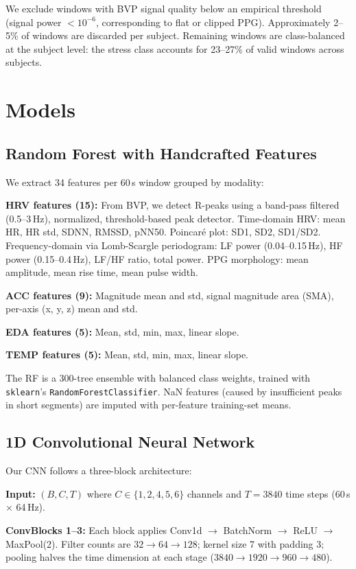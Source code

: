 \documentclass[10pt,twocolumn]{article}
\begin{document}
We exclude windows with BVP signal quality below an empirical threshold
(signal power $< 10^{-6}$, corresponding to flat or clipped PPG).
Approximately 2--5\% of windows are discarded per subject.
Remaining windows are class-balanced at the subject level: the stress
class accounts for 23--27\% of valid windows across subjects.

\section{Models}
\label{sec:models}

\subsection{Random Forest with Handcrafted Features}

We extract 34 features per 60\,s window grouped by modality:

\textbf{HRV features (15):} From BVP, we detect R-peaks using a
band-pass filtered (0.5--3\,Hz), normalized, threshold-based peak detector.
Time-domain HRV: mean HR, HR std, SDNN, RMSSD, pNN50.
Poincar\'e plot: SD1, SD2, SD1/SD2. Frequency-domain via Lomb-Scargle
periodogram: LF power (0.04--0.15\,Hz), HF power (0.15--0.4\,Hz),
LF/HF ratio, total power. PPG morphology: mean amplitude, mean rise time,
mean pulse width.

\textbf{ACC features (9):} Magnitude mean and std, signal magnitude area (SMA),
per-axis (x, y, z) mean and std.

\textbf{EDA features (5):} Mean, std, min, max, linear slope.

\textbf{TEMP features (5):} Mean, std, min, max, linear slope.

The RF is a 300-tree ensemble with balanced class weights, trained with
\texttt{sklearn}'s \texttt{RandomForestClassifier}. NaN features
(caused by insufficient peaks in short segments) are imputed with
per-feature training-set means.

\subsection{1D Convolutional Neural Network}

Our CNN follows a three-block architecture:

\textbf{Input:} $(B, C, T)$ where $C \in \{1,2,4,5,6\}$ channels and
$T=3840$ time steps (60\,s $\times$ 64\,Hz).

\textbf{ConvBlocks 1--3:} Each block applies Conv1d $\to$ BatchNorm $\to$ ReLU $\to$
MaxPool(2). Filter counts are $32 \to 64 \to 128$; kernel size 7 with
padding 3; pooling halves the time dimension at each stage ($3840 \to
1920 \to 960 \to 480$).
\end{document}
